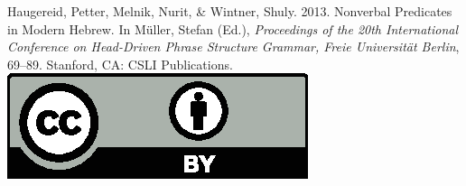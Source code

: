 \documentclass[a4paper,11pt]{article}
\begin{document}
\noindent



\vfill
\noindent
Haugereid, Petter, Melnik, Nurit, \& Wintner, Shuly. 2013. Nonverbal Predicates in {Modern Hebrew}. In Müller, Stefan (Ed.), \emph{{Proceedings of the 20th International Conference on Head-Driven Phrase Structure Grammar, Freie Universit\"{a}t Berlin}}, 69--89. Stanford,
CA: CSLI Publications. \hfill\href{http://creativecommons.org/licenses/by/4.0/}{\includegraphics[height=.75em]{Includes/ccby.eps}}

\newpage

        
\end{document}
